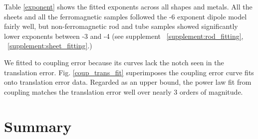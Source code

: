 \documentclass[journal,twoside,web]{ieeecolor}
\begin{document}
Table \ref{exponent} shows the fitted exponents across all shapes and metals. All the sheets and all the ferromagnetic samples followed the -6 exponent dipole model fairly well, but non-ferromagnetic rod and tube samples showed significantly lower exponents between -3 and -4 (see supplement ~\ref{supplement:rod_fitting}, ~\ref{supplement:sheet_fitting}.) 

We fitted to coupling error because its curves lack the notch seen in the translation error. Fig. \ref{coup_trans_fit} superimposes the coupling error curve fits onto translation error data. Regarded as an upper bound, the power law fit from coupling matches the translation error well over nearly 3 orders of magnitude. 

\section{Summary}
\end{document}
